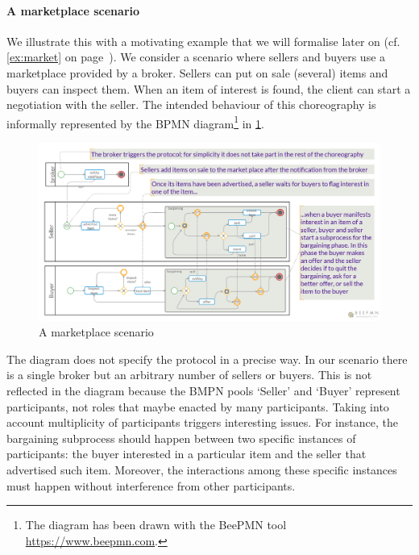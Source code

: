 % 
\paragraph{A marketplace scenario}
We illustrate this with a motivating example that we will formalise
later on (cf. \cref{ex:market} on page~\pageref{ex:market}).
%
We consider a scenario where sellers and buyers use a marketplace
provided by a broker.
%
Sellers can put on sale (several) items and buyers can inspect them.
%
When an item of interest is found, the client can start a negotiation
with the seller.
%
The intended behaviour of this choreography is informally represented
by the BPMN diagram\footnote{The diagram has been drawn with the
  BeePMN tool \url{https://www.beepmn.com}.} in \cref{fig:bpmn}.
%
\begin{figure}[t!]\centering
  \includegraphics[scale=.18]{marketplace}
  \caption{A marketplace scenario\label{fig:bpmn}}
\end{figure}
%
The diagram does not specify the protocol in a precise
way.
%
In our scenario there is a single broker but an arbitrary number of
sellers or buyers.
%
This is not reflected in the diagram because the BMPN pools `Seller'
and `Buyer' represent participants, not roles that maybe enacted by
many participants.
% 
Taking into account multiplicity of participants triggers interesting
issues.
% 
For instance, the bargaining subprocess should happen between two
specific instances of participants: the buyer interested in a
particular item and the seller that advertised such item.
% 
Moreover, the interactions among these specific instances must happen
without interference from other participants.


